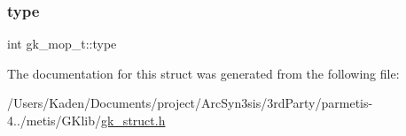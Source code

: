 \mbox{\label{a00678_a26d63dcd8e95d56959ef1c6f8ef37c6b}} 
\subsubsection{\texorpdfstring{type}{type}}
{\footnotesize\ttfamily int gk\+\_\+mop\+\_\+t\+::type}



The documentation for this struct was generated from the following file\+:\begin{DoxyCompactItemize}
\item 
/\+Users/\+Kaden/\+Documents/project/\+Arc\+Syn3sis/3rd\+Party/parmetis-\/4../metis/\+G\+Klib/\hyperlink{a00080}{gk\+\_\+struct.\+h}\end{DoxyCompactItemize}

